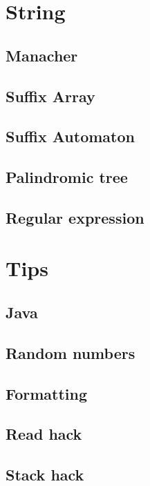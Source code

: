 \documentclass[titlepage,a4paper,10pt]{article}
\begin{document}
\begin{multicols}{2}
\begin{spacing}{0.6}
{		\section{String}
			\subsection{Manacher}
				
			\subsection{Suffix Array}
				
			\subsection{Suffix Automaton}
				
			\subsection{Palindromic tree}
				
			\subsection{Regular expression}
				
		\section{Tips}
			\subsection{Java}
				
			\subsection{Random numbers}
				
			\subsection{Formatting}
				
			\subsection{Read hack}
				
			\subsection{Stack hack}
				
}
\end{spacing}
\end{multicols}
\end{document}
